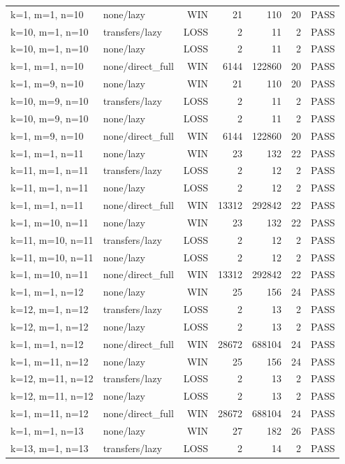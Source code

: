 \begin{longtable}{llrrrrl}
k=1, m=1, n=10 & none/lazy & WIN & 21 & 110 & 20 & PASS \\
k=10, m=1, n=10 & transfers/lazy & LOSS & 2 & 11 & 2 & PASS \\
k=10, m=1, n=10 & none/lazy & LOSS & 2 & 11 & 2 & PASS \\
k=1, m=1, n=10 & none/direct\_full & WIN & 6144 & 122860 & 20 & PASS \\
k=1, m=9, n=10 & none/lazy & WIN & 21 & 110 & 20 & PASS \\
k=10, m=9, n=10 & transfers/lazy & LOSS & 2 & 11 & 2 & PASS \\
k=10, m=9, n=10 & none/lazy & LOSS & 2 & 11 & 2 & PASS \\
k=1, m=9, n=10 & none/direct\_full & WIN & 6144 & 122860 & 20 & PASS \\
k=1, m=1, n=11 & none/lazy & WIN & 23 & 132 & 22 & PASS \\
k=11, m=1, n=11 & transfers/lazy & LOSS & 2 & 12 & 2 & PASS \\
k=11, m=1, n=11 & none/lazy & LOSS & 2 & 12 & 2 & PASS \\
k=1, m=1, n=11 & none/direct\_full & WIN & 13312 & 292842 & 22 & PASS \\
k=1, m=10, n=11 & none/lazy & WIN & 23 & 132 & 22 & PASS \\
k=11, m=10, n=11 & transfers/lazy & LOSS & 2 & 12 & 2 & PASS \\
k=11, m=10, n=11 & none/lazy & LOSS & 2 & 12 & 2 & PASS \\
k=1, m=10, n=11 & none/direct\_full & WIN & 13312 & 292842 & 22 & PASS \\
k=1, m=1, n=12 & none/lazy & WIN & 25 & 156 & 24 & PASS \\
k=12, m=1, n=12 & transfers/lazy & LOSS & 2 & 13 & 2 & PASS \\
k=12, m=1, n=12 & none/lazy & LOSS & 2 & 13 & 2 & PASS \\
k=1, m=1, n=12 & none/direct\_full & WIN & 28672 & 688104 & 24 & PASS \\
k=1, m=11, n=12 & none/lazy & WIN & 25 & 156 & 24 & PASS \\
k=12, m=11, n=12 & transfers/lazy & LOSS & 2 & 13 & 2 & PASS \\
k=12, m=11, n=12 & none/lazy & LOSS & 2 & 13 & 2 & PASS \\
k=1, m=11, n=12 & none/direct\_full & WIN & 28672 & 688104 & 24 & PASS \\
k=1, m=1, n=13 & none/lazy & WIN & 27 & 182 & 26 & PASS \\
k=13, m=1, n=13 & transfers/lazy & LOSS & 2 & 14 & 2 & PASS \\

\end{longtable}
